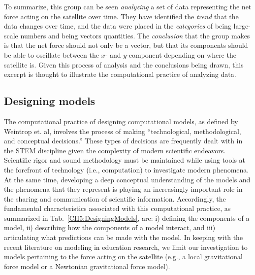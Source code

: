 \documentclass{msuphddissertation}
\begin{document}
\begin{doublespace}
To summarize, this group can be seen \textit{analyzing} a set of data representing the net force acting on the satellite over time.  They have identified the \textit{trend} that the data changes over time, and the data were placed in the \textit{categories} of being large-scale numbers and being vectors quantities.  The \textit{conclusion} that the group makes is that the net force should not only be a vector, but that its components should be able to oscillate between the $x$- and $y$-component depending on where the satellite is.  Given this process of analysis and the conclusions being drawn, this excerpt is thought to illustrate the computational practice of analyzing data.

%
%
%
%
%
%
%
%
%
%
%
%
%
%
%
%

\subsection{Designing models}

The computational practice of designing computational models, as defined by Weintrop et. al, involves the process of making ``technological, methodological, and conceptual decisions.''  These types of decisions are frequently dealt with in the STEM discipline given the complexity of modern scientific endeavors.  Scientific rigor and sound methodology must be maintained while using tools at the forefront of technology (i.e., computation) to investigate modern phenomena.  At the same time, developing a deep conceptual understanding of the models and the phenomena that they represent is playing an increasingly important role in the sharing and communication of scientific information.  Accordingly, the fundamental characteristics associated with this computational practice, as summarized in Tab.~\ref{CH5:DesigningModels}, are: i) defining the components of a model, ii) describing how the components of a model interact, and iii) articulating what predictions can be made with the model.  In keeping with the recent literature on modeling in education research, we limit our investigation to models pertaining to the force acting on the satellite (e.g., a local gravitational force model or a Newtonian gravitational force model).


\end{doublespace}
\end{document}

